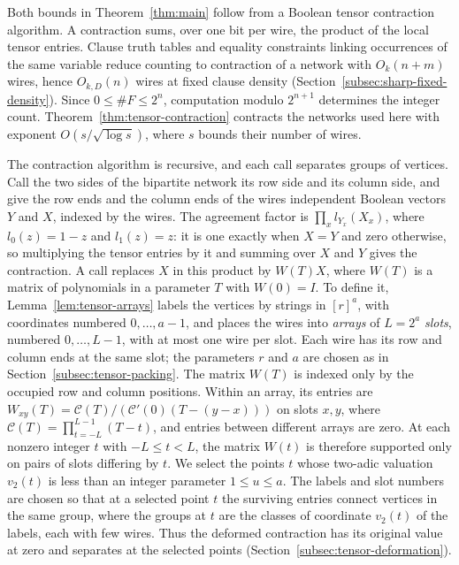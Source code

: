 \documentclass[11pt,reqno]{amsart}
\numberwithin{equation}{section}
\theoremstyle{definition}\newtheorem{definition}[theorem]{Definition}
\theoremstyle{remark}\newtheorem{remark}[theorem]{Remark}
\renewcommand{\le}{\leqslant}
\begin{document}
Both bounds in Theorem~\ref{thm:main} follow from a Boolean tensor
contraction algorithm. A contraction sums, over one bit per wire,
the product of the local tensor entries. Clause truth tables and
equality constraints linking occurrences of the same variable reduce
counting to contraction of a network with $O_k(n+m)$ wires, hence
$O_{k,D}(n)$ wires at fixed clause density
(Section~\ref{subsec:sharp-fixed-density}). Since $0\le\#F\le2^n$,
computation modulo $2^{n+1}$ determines the integer count.
Theorem~\ref{thm:tensor-contraction} contracts the networks
used here with exponent $O(s/\sqrt{\log s})$, where $s$ bounds their
number of wires.

The contraction algorithm is recursive, and each call separates groups
of vertices. Call the two sides of the bipartite network its row side
and its column side, and give the row ends and the column ends of the
wires independent Boolean vectors $Y$ and $X$, indexed by the wires.
The agreement factor is $\prod_x l_{Y_x}(X_x)$, where $l_0(z)=1-z$ and
$l_1(z)=z$: it is one exactly when $X=Y$ and zero otherwise, so
multiplying the tensor entries by it and summing over $X$ and $Y$
gives the contraction. A call replaces $X$ in this product by
$W(T)X$, where $W(T)$ is a matrix of polynomials in a parameter $T$
with $W(0)=I$. To define it, Lemma~\ref{lem:tensor-arrays} labels the
vertices by strings in $[r]^a$, with coordinates numbered
$0,\ldots,a-1$, and places the wires into \emph{arrays} of $L=2^a$
\emph{slots}, numbered $0,\ldots,L-1$, with at most one wire per slot.
Each wire has its row and column ends at the same slot; the parameters
$r$ and $a$ are chosen as in Section~\ref{subsec:tensor-packing}.
The matrix $W(T)$ is indexed only by the occupied row and column
positions. Within an array, its entries are
$W_{xy}(T)=\mathcal C(T)/(\mathcal C'(0)(T-(y-x)))$ on slots $x,y$,
where $\mathcal C(T)=\prod_{t=-L}^{L-1}(T-t)$, and entries between
different arrays are zero. At each nonzero integer $t$ with
$-L\le t<L$, the matrix $W(t)$ is therefore supported only on pairs of
slots differing by $t$. We select the points $t$ whose two-adic
valuation $v_2(t)$ is less than an integer parameter $1\le u\le a$.
The labels and slot
numbers are chosen so that at a selected point $t$ the surviving
entries connect vertices in the same group, where the groups at $t$
are the classes of coordinate $v_2(t)$ of the labels, each with few
wires. Thus the deformed contraction has its original value at zero
and separates at the selected points
(Section~\ref{subsec:tensor-deformation}).
\end{document}
